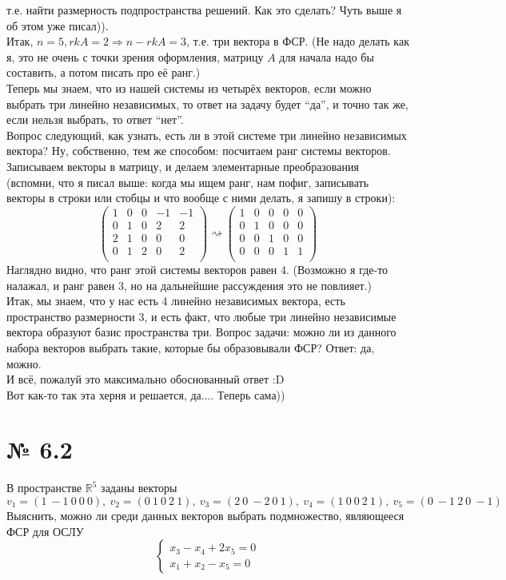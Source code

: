 \documentclass[a4paper,11pt]{report}
\begin{document}
т.е. найти размерность подпространства решений. Как это сделать? Чуть выше я об этом уже писал)).\\
Итак, $n = 5, rkA = 2 \Rightarrow n - rkA = 3$, т.е. три вектора в ФСР. (Не надо делать как я, это не очень с точки зрения оформления, матрицу $A$ для
начала надо бы составить, а потом писать про её ранг.)\\
Теперь мы знаем, что из нашей системы из четырёх векторов, если можно выбрать три линейно независимых, то ответ на задачу будет ``да'',
и точно так же, если нельзя выбрать, то ответ ``нет''.\\
Вопрос следующий, как узнать, есть ли в этой системе три линейно независимых вектора? Ну, собственно, тем же способом: посчитаем ранг системы векторов.
Записываем векторы в матрицу, и делаем элементарные преобразования (вспомни, что я писал выше: когда мы ищем ранг, нам пофиг, записывать
векторы в строки или стобцы и что вообще с ними делать, я запишу в строки):
\[
\begin{pmatrix}
1 & 0 & 0 & -1 & -1\\ 
0 & 1 & 0 & 2 & 2\\
2 & 1 & 0 & 0 & 0\\
0 & 1 & 2 & 0 & 2\\
\end{pmatrix}
\rightsquigarrow
\begin{pmatrix}
1 & 0 & 0 & 0 & 0\\ 
0 & 1 & 0 & 0 & 0\\
0 & 0 & 1 & 0 & 0\\
0 & 0 & 0 & 1 & 1\\
\end{pmatrix}
\]
Наглядно видно, что ранг этой системы векторов равен 4. (Возможно я где-то налажал, и ранг равен 3, но на дальнейшие рассуждения это не повлияет.)\\
Итак, мы знаем, что у нас есть 4 линейно независимых вектора, есть пространство размерности 3, и есть факт, что любые три линейно независимые вектора
образуют базис пространства три. Вопрос задачи: можно ли из данного набора векторов выбрать такие, которые бы образовывали ФСР? Ответ: да, можно.\\
И всё, пожалуй это максимально обоснованный ответ :D\\
Вот как-то так эта херня и решается, да.... Теперь сама))
\section{№ 6.2}
В пространстве $\mathbb{R}^5$ заданы векторы
\[
v_1 = (1\ -1\ 0\ 0\ 0),\
v_2 = (0\ 1\ 0\ 2\ 1),\ 
v_3 = (2\ 0\ -2\ 0\ 1),\
v_4 = (1\ 0\ 0\ 2\ 1),\
v_5 = (0\ -1\ 2\ 0\ -1) \
\]
Выяснить, можно ли среди данных векторов выбрать подмножество, являющееся ФСР для ОСЛУ
\[
\begin{cases}
x_3 - x_4 + 2x_5 = 0\\
x_1 + x_2 - x_5 = 0
\end{cases}
\]
\end{document}

